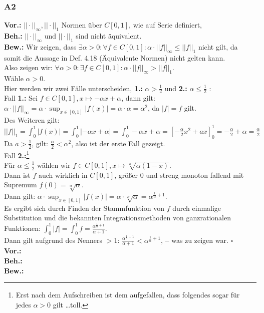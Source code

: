 \documentclass[12pt, a4paper]{article}
\newcommand*{\qed}{\null\nobreak\hfill\ensuremath{\square}}
\newcommand*{\gedanke}{\textbf{-- }}
\newcommand*{\gap}{\text{ }}
\newcommand*{\vor}{\textbf{Vor.:} \gap}
\newcommand*{\beh}{\textbf{Beh.:} \gap}
\newcommand*{\bew}{\textbf{Bew.:} \gap}
\begin{document}
\subsubsection*{A2}
\vor \(||\cdot||_\infty, ||\cdot||_1\) Normen über \(C[0,1]\), wie auf Serie definiert,\\
\beh \(||\cdot||_\infty \text{ und } ||\cdot||_1\) sind nicht äquivalent. \\
\bew Wir zeigen, dass \(\exists \alpha > 0: \forall f \in C[0,1]: \alpha \cdot ||f||_\infty \le ||f||_1\) nicht gilt, da somit die Aussage in Def. 4.18 (Äquivalente Normen) nicht gelten kann. \\
Also zeigen wir: \(\forall \alpha > 0: \exists f \in C[0,1]: \alpha \cdot ||f||_\infty > ||f||_1\). \\
Wähle \(\alpha > 0\).\\
Hier werden wir zwei Fälle unterscheiden, \textbf{1.:} \(\alpha > \frac{1}{2}\) und \textbf{2.:} \(\alpha \le \frac{1}{2}\) : \\
Fall \textbf{1.:} Sei \(f \in C[0,1], x \mapsto -\alpha x + \alpha\), dann gilt: \\
\(\alpha \cdot ||f||_\infty = \alpha \cdot \sup_{x\in [0,1]}|f(x)| = \alpha \cdot \alpha = \alpha^2\),  da \(|f| = f\) gilt. \\
Des Weiteren gilt: \(||f||_1 = \int_{0}^{1}|f(x)| = \int_{0}^{1}|-\alpha x + \alpha| = \int_{0}^{1}-\alpha x + \alpha = \left[-\frac{\alpha}{2}x^2+ ax\right]_0^1 = -\frac{\alpha}{2} + \alpha = \frac{\alpha}{2}\) \\
Da \(a > \frac{1}{2}\), gilt: \(\frac{\alpha}{2} < \alpha^2\), also ist der erste Fall gezeigt. \\
Fall \textbf{2.:}\footnote[1]{Erst nach dem Aufschreiben ist dem  aufgefallen, dass folgendes sogar für jedes \(\alpha > 0\) gilt \dots toll.} \\
Für \(\alpha \le \frac{1}{2}\) wählen wir \(f \in C[0,1], x \mapsto \sqrt[\alpha]{\alpha(1-x)}\). \\
Dann ist \(f\) auch wirklich in \(C[0,1]\), größer 0 und streng monoton fallend mit Supremum \(f(0) = \sqrt[\alpha]{\alpha}\). \\
Dann gilt: \(\alpha \cdot \sup_{x \in [0,1]}|f(x)| = \alpha \cdot \sqrt[\alpha]{\alpha} = \alpha^{\frac{1}{\alpha} + 1}\). \\
Es ergibt sich durch Finden der Stammfunktion von \(f\) durch einmalige Substitution und die bekannten Integrationsmethoden von ganzrationalen Funktionen: \(\int_{0}^{1}|f| = \int_{0}^{1}f = \frac{\alpha^{\frac{1}{\alpha} + 1}}{\alpha + 1}\).\\
Dann gilt aufgrund des Nenners \(> 1\): \(\frac{\alpha^{\frac{1}{\alpha} + 1}}{\alpha + 1} < \alpha^ {\frac{1}{\alpha} + 1}\), \gedanke was zu zeigen war. \qed \\
\vor \\
\beh \\
\bew \\
\end{document}
